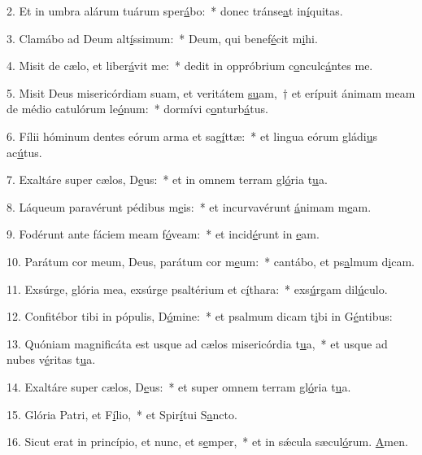 2. Et in umbra alárum tuárum sper\uline{á}bo:~* donec tránse\uline{a}t in\uline{í}quitas.\par 
3. Clamábo ad Deum alt\uline{í}ssimum:~* Deum, qui benef\uline{é}cit m\uline{i}hi.\par 
4. Misit de cælo, et liber\uline{á}vit me:~* dedit in oppróbrium c\uline{o}nculc\uline{á}ntes me.\par 
5. Misit Deus misericórdiam suam, et veritátem \uline{su}am,~† et erípuit ánimam meam de médio catulórum le\uline{ó}num:~* dormívi c\uline{o}nturb\uline{á}tus.\par 
6. Fílii hóminum dentes eórum arma et sag\uline{í}ttæ:~* et lingua eórum gládi\uline{u}s ac\uline{ú}tus.\par 
7. Exaltáre super cælos, D\uline{e}us:~* et in omnem terram gl\uline{ó}ria t\uline{u}a.\par 
8. Láqueum paravérunt pédibus m\uline{e}is:~* et incurvavérunt \uline{á}nimam m\uline{e}am.\par 
9. Fodérunt ante fáciem meam f\uline{ó}veam:~* et incid\uline{é}runt in \uline{e}am.\par 
10. Parátum cor meum, Deus, parátum cor m\uline{e}um:~* cantábo, et ps\uline{a}lmum d\uline{i}cam.\par 
11. Exsúrge, glória mea, exsúrge psaltérium et c\uline{í}thara:~* exs\uline{ú}rgam dil\uline{ú}culo.\par 
12. Confitébor tibi in pópulis, D\uline{ó}mine:~* et psalmum dicam t\uline{i}bi in G\uline{é}ntibus:\par 
13. Quóniam magnificáta est usque ad cælos misericórdia t\uline{u}a,~* et usque ad nubes v\uline{é}ritas t\uline{u}a.\par 
14. Exaltáre super cælos, D\uline{e}us:~* et super omnem terram gl\uline{ó}ria t\uline{u}a.\par 
15. Glória Patri, et F\uline{í}lio,~* et Spir\uline{í}tui S\uline{a}ncto.\par 
16. Sicut erat in princípio, et nunc, et s\uline{e}mper,~* et in sǽcula sæcul\uline{ó}rum. \uline{A}men.\par 
